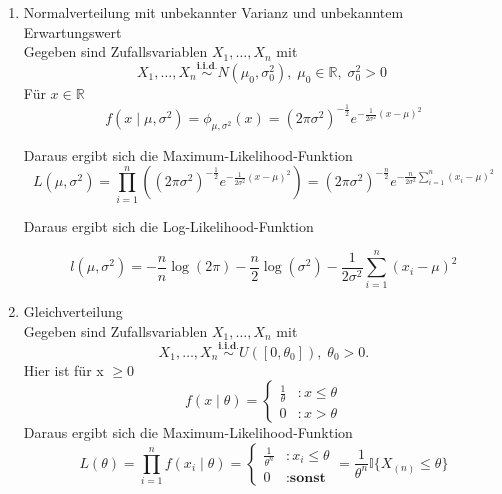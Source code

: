 \documentclass[10pt]{article}
\newcommand{\FZV}{X_1, \ldots, X_n} %
\newcommand{\IR}{\mathbb{R}} %
\newcommand{\xt}{x \mid \theta} %
\begin{document}
\begin{enumerate}[label = (\roman*)]
		
		\item Normalverteilung mit unbekannter Varianz und unbekanntem Erwartungswert\\
		Gegeben sind Zufallsvariablen $\FZV$ mit
		\begin{equation*}
			\FZV \overset{\textbf{i.i.d.}} {\sim} N(\mu_0,\sigma_0^2),\; \mu_0 \in \IR, \; \sigma_0^2 >0 \; 
		\end{equation*} 
		Für $x \in \IR$		
		\begin{equation*}
			f(x \mid \mu, \sigma^2) = \phi_{\mu,\sigma^2}(x)=(2\pi\sigma^2)^{-\frac{1}{2}}e^{-\frac{1}{2\sigma^2}(x-\mu)^2}
		\end{equation*}
		
		Daraus ergibt sich die Maximum-Likelihood-Funktion
		\begin{equation*}
			L(\mu, \sigma^2) = \prod_{i=1}^{n}((2\pi\sigma^2)^{-\frac{1}{2}}e^{-\frac{1}{2\sigma^2}(x-\mu)^2}) = (2\pi\sigma^2)^{-\frac{n}{2}}e^{-\frac{n}{2\sigma^2}\sum_{i=1}^{n}(x_i-\mu)^2}
		\end{equation*}
		
		Daraus ergibt sich die Log-Likelihood-Funktion
		
		\begin{equation*}
			l(\mu, \sigma^2) = -\frac{n}{n}\log(2\pi) - \frac{n}{2}\log(\sigma^2)-\frac{1}{2\sigma^2}\sum_{i=1}^{n}(x_i-\mu)^2
		\end{equation*}
		
		\item Gleichverteilung\\
		Gegeben sind Zufallsvariablen $\FZV$ mit
		\begin{equation*}
			\FZV \overset{\textbf{i.i.d.}}{\sim} U([0,\theta_0]), \; \theta_0 >0.
		\end{equation*}
		Hier ist für x $\geq 0$
		\begin{equation*}
			f(\xt)=\begin{cases}
				\frac{1}{\theta} &: x\leq \theta\\
				0 &: x >\theta
			\end{cases}
		\end{equation*}
		Daraus ergibt sich die Maximum-Likelihood-Funktion
		\begin{equation*}
			L(\theta)=\prod_{i=1}^{n} f(x_i \mid \theta) = \begin{cases}
				\frac{1}{\theta^n} &: x_i\leq \theta\\
				0 &: \textbf{sonst}
			\end{cases} = \frac{1}{\theta^n} \mathbb{I}\{X_{(n)} \leq \theta\}
		\end{equation*}
		
	\end{enumerate}	
\end{document}
